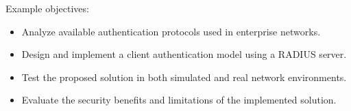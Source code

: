 Example objectives:

\begin{itemize}
	\item Analyze available authentication protocols used in enterprise networks.
	\item Design and implement a client authentication model using a RADIUS server.
	\item Test the proposed solution in both simulated and real network environments.
	\item Evaluate the security benefits and limitations of the implemented solution.
\end{itemize}

\newpage
